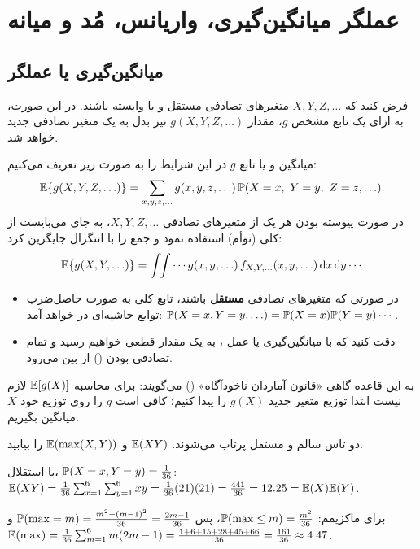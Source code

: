 \chapter{عملگر میانگین‌گیری، واریانس، مُد و میانه}

\section{میانگین‌گیری یا عملگر }

فرض کنید که $X,Y,Z,\ldots$ متغیرهای تصادفی \textcolor{red!70!black}{مستقل} و یا \textcolor{red!70!black}{وابسته} باشند. در این صورت، به ازای یک تابع مشخص $g$، مقدار $g(X,Y,Z,\ldots)$ نیز بدل به یک متغیر تصادفی جدید خواهد شد.

\begin{definition}
میانگین و یا  تابع $g$ در این شرایط را به صورت زیر تعریف می‌کنیم:
\[
\E\{g(X,Y,Z,\ldots)\}=\sum_{x,y,z,\ldots}g(x,y,z,\ldots)\,\Prob(X=x,\ Y=y,\ Z=z,\ldots).
\]
در صورت پیوسته بودن هر یک از متغیرهای تصادفی $X,Y,Z,\ldots$، به جای  می‌بایست از  کلی (توأم) استفاده نمود و جمع را با انتگرال جایگزین کرد:
\[
\mathbb{E}\{g(X,Y,\ldots)\}=\int\!\!\int\cdots g(x,y,\ldots)\,f_{X,Y,\ldots}(x,y,\ldots)\,\mathrm{d} x\,\mathrm{d} y\cdots
\]
\end{definition}

\begin{itemize}
\item در صورتی که متغیرهای تصادفی \textbf{مستقل} باشند، تابع  کلی به صورت حاصل‌ضرب توابع  حاشیه‌ای در خواهد آمد:
$\mathbb{P}(X=x,Y=y,\ldots)=\mathbb{P}(X=x)\mathbb{P}(Y=y)\cdots$.
\item دقت کنید که با میانگین‌گیری یا عمل ، به یک مقدار قطعی خواهیم رسید و تمام تصادفی بودن () از بین می‌رود.
\end{itemize}

\begin{note}
\notetitle به این قاعده گاهی «قانون آماردان ناخودآگاه» () می‌گویند: برای محاسبه $\mathbb{E}[g(X)]$ لازم نیست ابتدا توزیع متغیر جدید $g(X)$ را پیدا کنیم؛ کافی است $g$ را روی توزیع خود $X$ میانگین بگیریم.
\end{note}

\begin{example}
دو تاس سالم و مستقل پرتاب می‌شوند. $\mathbb{E}(XY)$ و $\mathbb{E}(\max(X,Y))$ را بیابید.
\begin{solution}
با استقلال، $\mathbb{P}(X=x,Y=y)=\frac1{36}$:
$\mathbb{E}(XY)=\frac1{36}\sum_{x=1}^6\sum_{y=1}^6xy=\frac1{36}(21)(21)=\frac{441}{36}=12.25=\mathbb{E}(X)\mathbb{E}(Y)$.

برای ماکزیمم: $\mathbb{P}(\max\le m)=\frac{m^2}{36}$، پس $\mathbb{P}(\max=m)=\frac{m^2-(m-1)^2}{36}=\frac{2m-1}{36}$ و
$\mathbb{E}(\max)=\frac{1}{36}\sum_{m=1}^6m(2m-1)=\frac{1+6+15+28+45+66}{36}=\frac{161}{36}\approx4.47$.
\end{solution}
\end{example}

